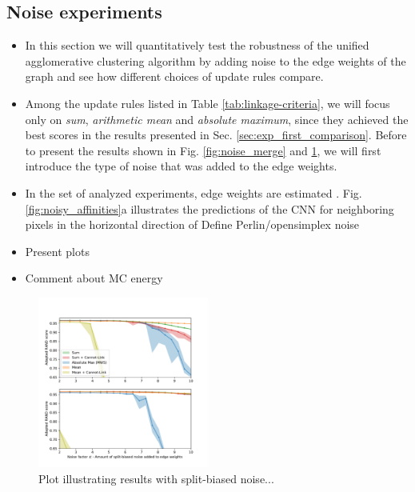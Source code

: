 \subsection{Noise experiments}
\begin{itemize}
    \item In this section we will quantitatively test the robustness of the unified agglomerative clustering algorithm by adding noise to the edge weights of the graph and see how different choices of update rules compare.
    \item Among the update rules listed in Table \ref{tab:linkage-criteria}, we will focus only on \emph{sum}, \emph{arithmetic mean} and \emph{absolute maximum}, since they achieved the best scores in the results presented in Sec. \ref{sec:exp_first_comparison}. Before to present the results shown in Fig. \ref{fig:noise_merge} and \ref{fig:noise_split}, we will first introduce the type of noise that was added to the edge weights.
\item In the set of analyzed experiments, edge weights are estimated . Fig. \ref{fig:noisy_affinities}a illustrates the predictions of the CNN for neighboring pixels in the horizontal direction of Define Perlin/opensimplex noise
\item Present plots
\item Comment about MC energy
\end{itemize}


\begin{figure}
\centering
\includegraphics[width=0.50\textwidth,trim=0.27in 0.27in 0.27in 0.27in,clip]{./figs/split_noise.pdf}
\caption{Plot illustrating results with split-biased noise...}\label{fig:noise_split}
\end{figure}


